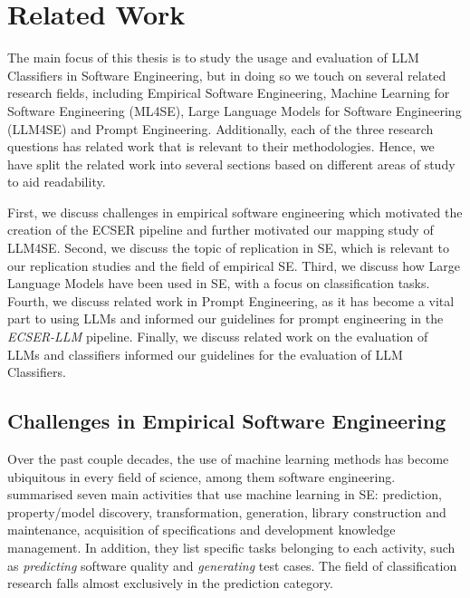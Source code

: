 \documentclass[a4paper]{article}
\newcommand{\newecser}{\textit{ECSER-LLM} }
\begin{document}
\section{Related Work} \label{Related Work}
The main focus of this thesis is to study the usage and evaluation of LLM Classifiers in Software Engineering, but in doing so we touch on several related research fields, including Empirical Software Engineering, Machine Learning for Software Engineering (ML4SE), Large Language Models for Software Engineering (LLM4SE) and Prompt Engineering. Additionally, each of the three research questions has related work that is relevant to their methodologies. Hence, we have split the related work into several sections based on different areas of study to aid readability. 

First, we discuss challenges in empirical software engineering which motivated the creation of the ECSER pipeline and further motivated our mapping study of LLM4SE. Second, we discuss the topic of replication in SE, which is relevant to our replication studies and the field of empirical SE. Third, we discuss how Large Language Models have been used in SE, with a focus on classification tasks. Fourth, we discuss related work in Prompt Engineering, as it has become a vital part to using LLMs and informed our guidelines for prompt engineering in the \newecser pipeline. Finally, we discuss related work on the evaluation of LLMs and classifiers informed our guidelines for the evaluation of LLM Classifiers.

\subsection{Challenges in Empirical Software Engineering}
Over the past couple decades, the use of machine learning methods has become ubiquitous in every field of science, among them software engineering. \textcite{Zhang2002} summarised seven main activities that use machine learning in SE: prediction, property/model discovery, transformation, generation, library construction and maintenance, acquisition of specifications and development knowledge management. In addition, they list specific tasks belonging to each activity, such as \textit{predicting} software quality and \textit{generating} test cases. The field of classification research falls almost exclusively in the prediction category.
\end{document}

